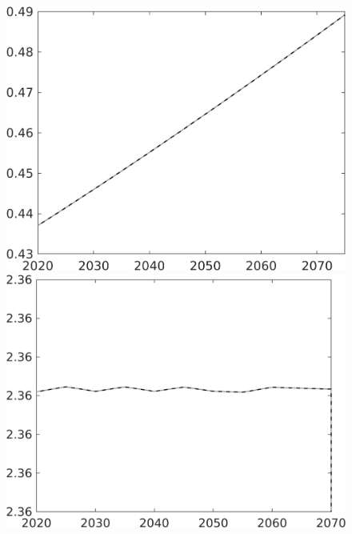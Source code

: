 \begin{figure}[h!!]
\begin{minipage}[]{0.32\textwidth}
	\end{minipage}	
	\begin{minipage}[]{0.32\textwidth}
		\includegraphics[width=1\textwidth]{../../codding_model/own_basedOnFried/optimalPol_010922_revision/figures/all_13Sept22/CompTaul_Equlab_LFBAU_Reg0_EY_spillover0_nsk1_xgr1_knspil1_sep1_countec0_GovRev0_etaa0.79_lgd0.png}
	\end{minipage}	
	\begin{minipage}[]{0.32\textwidth}
		\includegraphics[width=1\textwidth]{../../codding_model/own_basedOnFried/optimalPol_010922_revision/figures/all_13Sept22/CompTaul_Equlab_LFBAU_Reg0_gAn_spillover0_nsk1_xgr1_knspil1_sep1_countec0_GovRev0_etaa0.79_lgd0.png}

\end{minipage}
\end{figure}
